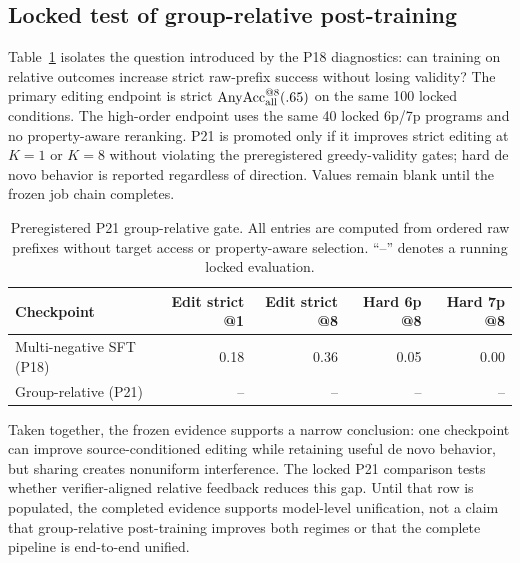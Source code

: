 \subsection{Locked test of group-relative post-training}
Table~\ref{tab:group-relative-gate} isolates the question introduced by the
P18 diagnostics: can training on relative outcomes increase strict raw-prefix
success without losing validity? The primary editing endpoint is strict
$\operatorname{AnyAcc}_{\rm all}^{@8}(.65)$ on the same 100 locked conditions.
The high-order endpoint uses the same 40 locked 6p/7p programs and no
property-aware reranking. P21 is promoted only if it improves strict editing at
$K=1$ or $K=8$ without violating the preregistered greedy-validity gates; hard
de novo behavior is reported regardless of direction. Values remain blank
until the frozen job chain completes.

\begin{table}[t]
  \centering
  \caption{Preregistered P21 group-relative gate. All entries are computed from
  ordered raw prefixes without target access or property-aware selection.
  ``--'' denotes a running locked evaluation.}
  \label{tab:group-relative-gate}
  \small
  \setlength{\tabcolsep}{5pt}
  \begin{tabular}{lrrrr}
    \toprule
    Checkpoint & Edit strict @1 & Edit strict @8
      & Hard 6p @8 & Hard 7p @8 \\
    \midrule
    Multi-negative SFT (P18) & 0.18 & 0.36 & 0.05 & 0.00 \\
    Group-relative (P21) & -- & -- & -- & -- \\
    \bottomrule
  \end{tabular}
\end{table}

Taken together, the frozen evidence supports a narrow conclusion: one
checkpoint can improve source-conditioned editing while retaining useful de
novo behavior, but sharing creates nonuniform interference. The locked P21
comparison tests whether verifier-aligned relative feedback reduces this gap.
Until that row is populated, the completed evidence supports model-level
unification, not a claim that group-relative post-training improves both
regimes or that the complete pipeline is end-to-end unified.

